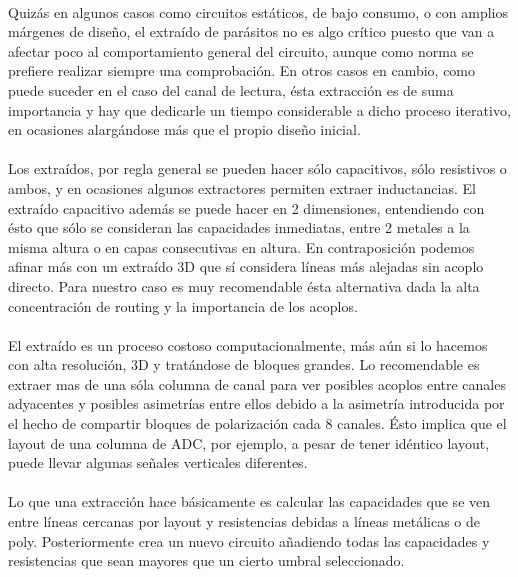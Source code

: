 \paragraph{}
Quizás en algunos casos como circuitos estáticos, de bajo consumo, o con amplios
márgenes de diseño, el extraído de parásitos no es algo crítico puesto que van a
afectar poco al comportamiento general del circuito, aunque como norma se prefiere
realizar siempre una comprobación. En otros casos en cambio, como puede suceder
en el caso del canal de lectura, ésta extracción es de suma importancia y hay
que dedicarle un tiempo considerable a dicho proceso iterativo, en ocasiones
alargándose más que el propio diseño inicial.

\paragraph{}
Los extraídos, por regla general se pueden hacer sólo capacitivos, sólo resistivos
o ambos, y en ocasiones algunos extractores permiten extraer inductancias. El extraído
capacitivo además se puede hacer en 2 dimensiones, entendiendo con ésto que sólo
se consideran las capacidades inmediatas, entre 2 metales a la misma altura o
en capas consecutivas en altura. En contraposición podemos afinar más con un
extraído 3D que sí considera líneas más alejadas sin acoplo directo. Para nuestro
caso es muy recomendable ésta alternativa dada la alta concentración de routing y
la importancia de los acoplos.

\paragraph{}
El extraído es un proceso costoso computacionalmente, más aún si lo hacemos con alta
resolución, 3D y tratándose de bloques grandes. Lo recomendable es extraer mas de una
sóla columna de canal para ver posibles acoplos entre canales adyacentes y posibles
asimetrías entre ellos debido a la asimetría introducida por el hecho de compartir
bloques de polarización cada 8 canales. Ésto implica que el layout de una columna
de ADC, por ejemplo, a pesar de tener idéntico layout, puede llevar algunas señales
verticales diferentes.

\paragraph{}
Lo que una extracción hace básicamente es calcular las capacidades que se ven
entre líneas cercanas por layout y resistencias debidas a líneas metálicas o
de poly. Posteriormente crea un nuevo circuito añadiendo todas las capacidades
y resistencias que sean mayores que un cierto umbral seleccionado.

